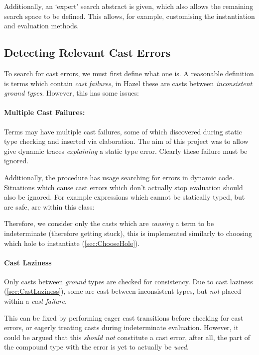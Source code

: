 Additionally, an `expert' search abstract is given, which also allows the remaining search space to be defined. This allows, for example, customising the instantiation and evaluation methods.

\subsection{Detecting Relevant Cast Errors}
\label{sec:CastFailureDetection}
To search for cast errors, we must first define what one is. A reasonable definition is terms which contain \textit{cast failures}, in Hazel these are casts between \textit{inconsistent ground types}. However, this has some issues:

\paragraph{Multiple Cast Failures:} Terms may have multiple cast failures, some of which discovered during static type checking and inserted via elaboration. The aim of this project was to allow give dynamic traces \textit{explaining} a static type error. Clearly these failure must be ignored.

Additionally, the procedure has usage searching for errors in dynamic code. Situations which cause cast errors which don't actually stop evaluation should also be ignored. For example expressions which cannot be statically typed, but are safe, are within this class: 

Therefore, we consider only the casts which are \textit{causing} a term to be indeterminate (therefore getting stuck), this is implemented similarly to choosing which hole to instantiate (\cref{sec:ChooseHole}).

\paragraph{Cast Laziness}
\label{sec:SearchCastLaziness}
Only casts between \textit{ground} types are checked for consistency. Due to cast laziness (\cref{sec:CastLaziness}), some are cast between inconsistent types, but \textit{not} placed within a \textit{cast failure}.

This can be fixed by performing eager cast transitions before checking for cast errors, or eagerly treating casts during indeterminate evaluation. However, it could be argued that this \textit{should not} constitute a cast error, after all, the part of the compound type with the error is yet to actually be \textit{used}.

